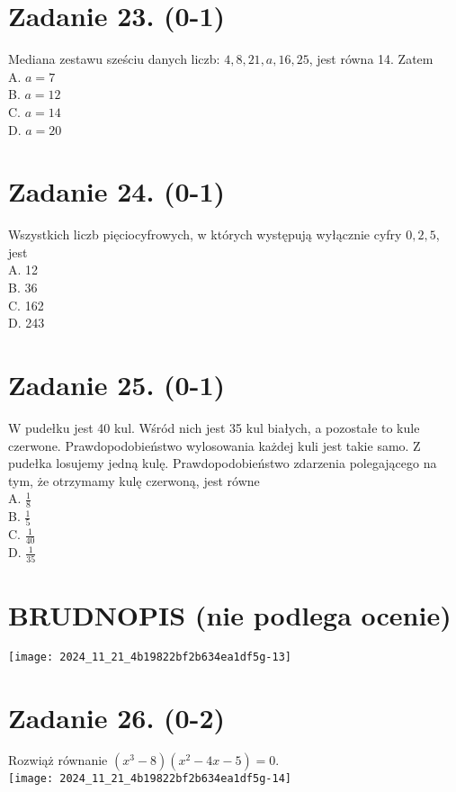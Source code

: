 \documentclass[10pt]{article}
\begin{document}
\section*{Zadanie 23. (0-1)}
Mediana zestawu sześciu danych liczb: \(4,8,21, a, 16,25\), jest równa 14. Zatem\\
A. \(a=7\)\\
B. \(a=12\)\\
C. \(a=14\)\\
D. \(a=20\)

\section*{Zadanie 24. (0-1)}
Wszystkich liczb pięciocyfrowych, w których występują wyłącznie cyfry \(0,2,5\), jest\\
A. 12\\
B. 36\\
C. 162\\
D. 243

\section*{Zadanie 25. (0-1)}
W pudełku jest 40 kul. Wśród nich jest 35 kul białych, a pozostałe to kule czerwone. Prawdopodobieństwo wylosowania każdej kuli jest takie samo. Z pudełka losujemy jedną kulę. Prawdopodobieństwo zdarzenia polegającego na tym, że otrzymamy kulę czerwoną, jest równe\\
A. \(\frac{1}{8}\)\\
B. \(\frac{1}{5}\)\\
C. \(\frac{1}{40}\)\\
D. \(\frac{1}{35}\)

\section*{BRUDNOPIS (nie podlega ocenie)}
\begin{center}
\texttt{[image: 2024\_11\_21\_4b19822bf2b634ea1df5g-13]}
\end{center}

\section*{Zadanie 26. (0-2)}
Rozwiąż równanie \(\left(x^{3}-8\right)\left(x^{2}-4 x-5\right)=0\).\\
\texttt{[image: 2024\_11\_21\_4b19822bf2b634ea1df5g-14]}
\end{document}
